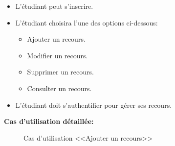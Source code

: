 \documentclass[12pt]{report}
\begin{document}
\begin{itemize}
    \item L'étudiant peut s'inscrire.
    \item L'étudiant choisira l'une des options ci-dessous:
    \begin{itemize}
        \item Ajouter un recours.
        \item Modifier un recours.
        \item Supprimer un recours.
        \item Consulter un recours.
    \end{itemize}
    \item L'étudiant doit s'authentifier pour gérer ses recours.
\end{itemize}

\newpage

\textbf{Cas d'utilisation détaillée:}

\begin{figure}[h]
\centering
    \caption*{Cas d'utilisation <<Ajouter un recours>>}
\end{figure}

\end{document}
